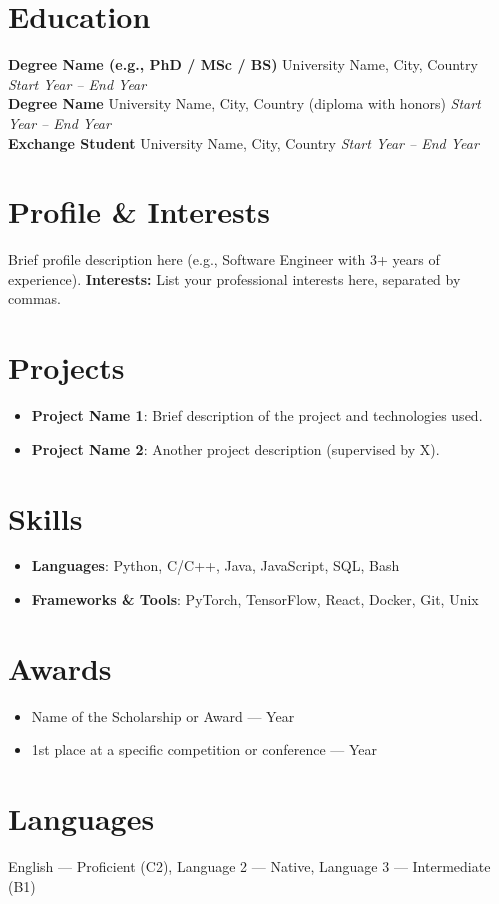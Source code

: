 \documentclass[a4paper,10pt]{article}
\begin{document}
\section*{Education}
\noindent
\textbf{Degree Name (e.g., PhD / MSc / BS)} \hfill University Name, City, Country \hfill \textit{Start Year -- End Year} \\
\textbf{Degree Name} \hfill University Name, City, Country (diploma with honors) \hfill \textit{Start Year -- End Year} \\
\textbf{Exchange Student} \hfill University Name, City, Country \hfill \textit{Start Year -- End Year}


\section*{Profile \& Interests}
Brief profile description here (e.g., Software Engineer with 3+ years of experience). \textbf{Interests:} List your professional interests here, separated by commas.


\section*{Projects}
\begin{itemize}[leftmargin=*, noitemsep, topsep=0pt]
    \item \textbf{Project Name 1}: Brief description of the project and technologies used.
    \item \textbf{Project Name 2}: Another project description (supervised by X).
\end{itemize}


\section*{Skills}
\begin{itemize}[leftmargin=*, noitemsep, topsep=0pt]
    \item \textbf{Languages}: Python, C/C++, Java, JavaScript, SQL, Bash
    \item \textbf{Frameworks \& Tools}: PyTorch, TensorFlow, React, Docker, Git, Unix
\end{itemize}


\section*{Awards}
\begin{itemize}[leftmargin=*, noitemsep, topsep=0pt]
    \item Name of the Scholarship or Award --- Year
    \item 1st place at a specific competition or conference --- Year
\end{itemize}


\section*{Languages}
English --- Proficient (C2), Language 2 --- Native, Language 3 --- Intermediate (B1)
\end{document}
